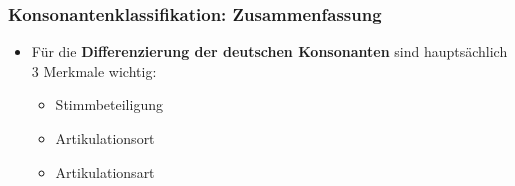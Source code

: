 \begin{frame}
\frametitle{Konsonantenklassifikation: Zusammenfassung}

	\begin{itemize}
		\item Für die \textbf{Differenzierung der deutschen Konsonanten} sind hauptsächlich 3 Merkmale wichtig:
		
		\begin{itemize}
			
			\item Stimmbeteiligung
			\item Artikulationsort
			\item Artikulationsart
		\end{itemize}
	\end{itemize}

\end{frame}


